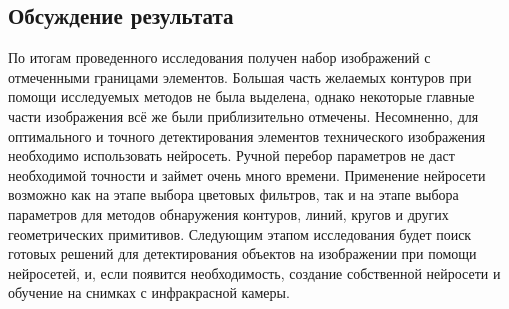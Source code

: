 
\subsection{Обсуждение результата}
По итогам проведенного исследования получен набор изображений с отмеченными границами элементов. Большая часть желаемых контуров при помощи исследуемых методов не была выделена, однако некоторые главные части изображения всё же были приблизительно отмечены. 
\newline
Несомненно, для оптимального и точного детектирования элементов технического изображения необходимо использовать нейросеть. Ручной перебор параметров не даст необходимой точности и займет очень много времени. Применение нейросети возможно как на этапе выбора цветовых фильтров, так и на этапе выбора параметров для методов обнаружения контуров, линий, кругов и других геометрических примитивов.
\newline
Следующим этапом исследования будет поиск готовых решений для детектирования объектов на изображении при помощи нейросетей, и, если появится необходимость, создание собственной нейросети и обучение на снимках с инфракрасной камеры.